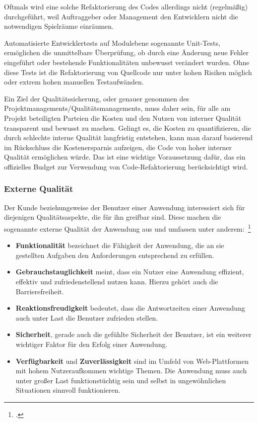 Oftmals wird eine solche Refaktorierung des Codes allerdings nicht (regelmäßig) durchgeführt, weil Auftraggeber oder Management den Entwicklern nicht die notwendigen Spielräume einräumen.

	Automatisierte Entwicklertests auf Modulebene sogenannte Unit-Tests, ermöglichen die unmittelbare Überprüfung, ob durch eine Änderung neue Fehler eingeführt oder bestehende Funktionalitäten unbewusst verändert wurden. Ohne diese Tests ist die Refaktorierung von Quellcode nur unter hohen Risiken möglich oder extrem hohen manuellen Testaufwänden.

Ein Ziel der Qualitätssicherung, oder genauer genommen des Projektmanagements/Qualitätsmanagements, muss daher sein, für alle am Projekt beteiligten Parteien die Kosten und den Nutzen von interner Qualität transparent und bewusst zu machen. Gelingt es, die Kosten zu quantifizieren, die durch schlechte interne Qualität langfristig entstehen, kann man darauf basierend im Rückschluss die Kostenersparnis aufzeigen, die Code von hoher interner Qualität ermöglichen würde. Das ist eine wichtige Voraussetzung dafür, das ein offizielles Budget zur Verwendung von Code-Refaktorierung berücksichtigt wird.

\subsubsection{Externe Qualität}
Der Kunde beziehungsweise der Benutzer einer Anwendung interessiert sich für diejenigen Qualitätsaspekte, die für ihn greifbar sind. Diese machen die sogenannte externe Qualität
der Anwendung aus und umfassen unter anderem:~\footcite[Vgl. Seite 5]{Bergmann.2013}
\begin{itemize}
	\item \textbf{Funktionalität} bezeichnet die Fähigkeit der Anwendung, die an sie gestellten Aufgaben den Anforderungen entsprechend zu erfüllen.
	
	\item \textbf{Gebrauchstauglichkeit} meint, dass ein Nutzer eine Anwendung effizient, effektiv und zufriedenstellend nutzen kann. Hierzu gehört auch die Barrierefreiheit.

	\item \textbf{Reaktionsfreudigkeit} bedeutet, dass die Antwortzeiten einer Anwendung auch unter Last die Benutzer zufrieden stellen. 

	\item \textbf{Sicherheit}, gerade auch die gefühlte Sicherheit der Benutzer, ist ein weiterer wichtiger Faktor für den Erfolg einer Anwendung.

	\item \textbf{Verfügbarkeit} und \textbf{Zuverlässigkeit} sind im Umfeld von Web-Plattformen mit hohem Nutzeraufkommen wichtige Themen. Die Anwendung muss auch unter großer Last funktionstüchtig sein und selbst in ungewöhnlichen Situationen sinnvoll funktionieren.
\end{itemize}

